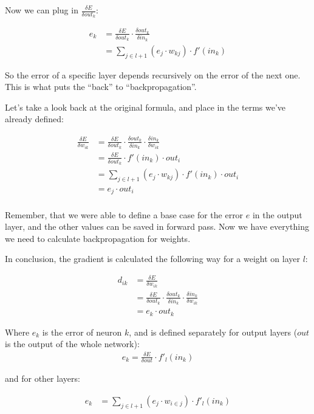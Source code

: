 \documentclass[a4paper, 12pt, finnish]{article}
\begin{document}
Now we can plug in $\frac{\delta E}{\delta out_k}$:

\begin{align*}
  e_k&=\frac{\delta E}{\delta out_k} \cdot \frac{\delta out_k}{\delta in_k} \\
  &= \sum_{j \in l + 1} \left( e_j \cdot w_{kj} \right) \cdot f'(in_k)
\end{align*}

So the error of a specific layer depends recursively on the error of the next one. This is what puts the ``back'' to ``backpropagation''.


Let's take a look back at the original formula, and place in the terms we've already defined:

\begin{align*}
  \frac{\delta E}{\delta w_{ik}} &= \frac{\delta E}{\delta out_k} \cdot \frac{\delta out_k}{\delta in_k}\cdot \frac{\delta in_k}{\delta w_{ik}} \\
  & = \frac{\delta E}{\delta out_k} \cdot f'(in_k)\cdot out_i \\
  & = \sum_{j \in l + 1} \left( e_j \cdot w_{kj} \right) \cdot f'(in_k)\cdot out_i \\
  &= e_j \cdot out_i \\
 \end{align*}

 Remember, that we were able to define a base case for the error $e$ in the output layer, and the other values can be saved in forward pass. Now we have everything we need to calculate backpropagation for weights.

 In conclusion, the gradient is calculated the following way for a weight on layer $l$:

 \begin{align*}
  d_{ik} &= \frac{\delta E}{\delta w_{ik}} \\ &= \frac{\delta E}{\delta out_k} \cdot \frac{\delta out_k}{\delta in_k}\cdot \frac{\delta in_k}{\delta w_{ik}} \\
  &= e_k \cdot out_k
 \end{align*}

Where $e_k$ is the error of neuron $k$, and is defined separately for output layers ($out$ is the output of the whole network):
\begin{align*}
    e_{k} = \frac{\delta E}{\delta out} \cdot f'_l(in_k)
\end{align*}

and for other layers:

\begin{align*}
  e_{k} &= \sum_{j \in l + 1} (e_j \cdot w_{i \in j})\cdot f'_l(in_k)
\end{align*}
\end{document}
